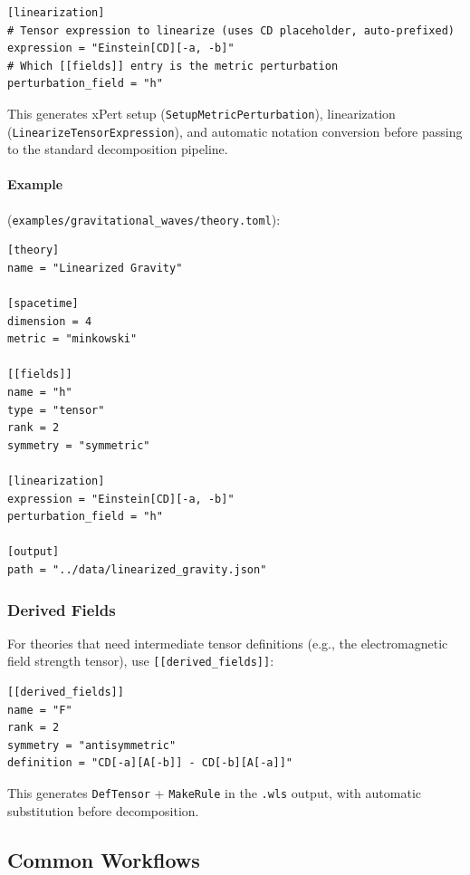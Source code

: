 \begin{lstlisting}[style=toml]
[linearization]
# Tensor expression to linearize (uses CD placeholder, auto-prefixed)
expression = "Einstein[CD][-a, -b]"
# Which [[fields]] entry is the metric perturbation
perturbation_field = "h"
\end{lstlisting}

This generates xPert setup (\texttt{SetupMetricPerturbation}), linearization (\texttt{LinearizeTensorExpression}), and automatic notation conversion before passing to the standard decomposition pipeline.

\paragraph{Example} (\texttt{examples/gravitational\_waves/theory.toml}):

\begin{lstlisting}[style=toml]
[theory]
name = "Linearized Gravity"

[spacetime]
dimension = 4
metric = "minkowski"

[[fields]]
name = "h"
type = "tensor"
rank = 2
symmetry = "symmetric"

[linearization]
expression = "Einstein[CD][-a, -b]"
perturbation_field = "h"

[output]
path = "../data/linearized_gravity.json"
\end{lstlisting}

\subsubsection{Derived Fields}

For theories that need intermediate tensor definitions (e.g., the electromagnetic field strength tensor), use \texttt{[[derived\_fields]]}:

\begin{lstlisting}[style=toml]
[[derived_fields]]
name = "F"
rank = 2
symmetry = "antisymmetric"
definition = "CD[-a][A[-b]] - CD[-b][A[-a]]"
\end{lstlisting}

This generates \texttt{DefTensor} + \texttt{MakeRule} in the \texttt{.wls} output, with automatic substitution before decomposition.

\subsection{Common Workflows}


